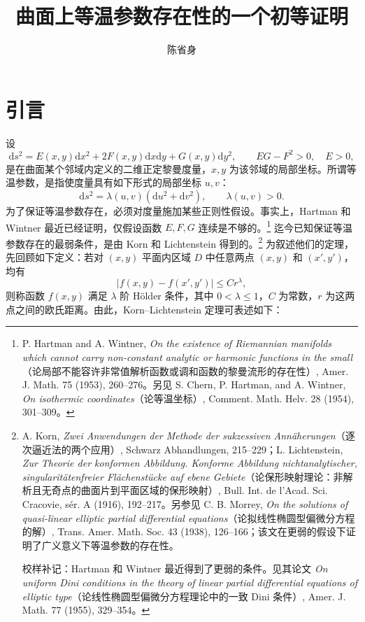 \documentclass[UTF8,a4paper,11pt,fontset=fandol]{ctexart}
\title{曲面上等温参数存在性的一个初等证明}
\author{陈省身}\date{}
\newcommand{\dd}{\mathrm d}
\begin{document}
\maketitle
\section{引言}
设
\begin{equation}\dd s^2=E(x,y)\dd x^2+2F(x,y)\dd x\dd y+G(x,y)\dd y^2,\qquad EG-F^2>0,\quad E>0,\tag{1}\end{equation}
是在曲面某个邻域内定义的二维正定黎曼度量，$x,y$ 为该邻域的局部坐标。所谓等温参数，是指使度量具有如下形式的局部坐标 $u,v$：
\begin{equation}\dd s^2=\lambda(u,v)(\dd u^2+\dd v^2),\qquad\lambda(u,v)>0.\tag{2}\end{equation}
为了保证等温参数存在，必须对度量施加某些正则性假设。事实上，Hartman 和 Wintner 最近已经证明，仅假设函数 $E,F,G$ 连续是不够的。\footnote{P. Hartman and A. Wintner, \textit{On the existence of Riemannian manifolds which cannot carry non-constant analytic or harmonic functions in the small}（论局部不能容许非常值解析函数或调和函数的黎曼流形的存在性）, Amer. J. Math. 75 (1953), 260--276。另见 S. Chern, P. Hartman, and A. Wintner, \textit{On isothermic coordinates}（论等温坐标）, Comment. Math. Helv. 28 (1954), 301--309。}
迄今已知保证等温参数存在的最弱条件，是由 Korn 和 Lichtenstein 得到的。\footnote{A. Korn, \textit{Zwei Anwendungen der Methode der sukzessiven Annäherungen}（逐次逼近法的两个应用）, Schwarz Abhandlungen, 215--229；L. Lichtenstein, \textit{Zur Theorie der konformen Abbildung. Konforme Abbildung nichtanalytischer, singularitätenfreier Flächenstücke auf ebene Gebiete}（论保形映射理论：非解析且无奇点的曲面片到平面区域的保形映射）, Bull. Int. de l'Acad. Sci. Cracovie, sér. A (1916), 192--217。另参见 C. B. Morrey, \textit{On the solutions of quasi-linear elliptic partial differential equations}（论拟线性椭圆型偏微分方程的解）, Trans. Amer. Math. Soc. 43 (1938), 126--166；该文在更弱的假设下证明了广义意义下等温参数的存在性。\par 校样补记：Hartman 和 Wintner 最近得到了更弱的条件。见其论文 \textit{On uniform Dini conditions in the theory of linear partial differential equations of elliptic type}（论线性椭圆型偏微分方程理论中的一致 Dini 条件）, Amer. J. Math. 77 (1955), 329--354。}
为叙述他们的定理，先回顾如下定义：若对 $(x,y)$ 平面内区域 $D$ 中任意两点 $(x,y)$ 和 $(x',y')$，均有
\begin{equation}|f(x,y)-f(x',y')|\le Cr^\lambda,\tag{3}\end{equation}
则称函数 $f(x,y)$ 满足 $\lambda$ 阶 Hölder 条件，其中 $0<\lambda\le1$，$C$ 为常数，$r$ 为这两点之间的欧氏距离。由此，Korn--Lichtenstein 定理可表述如下：
\end{document}
